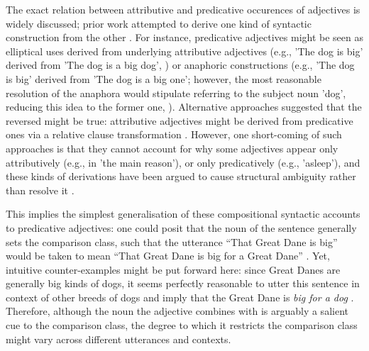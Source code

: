 The exact relation between attributive and predicative occurences of adjectives is widely discussed; prior work attempted to derive one kind of syntactic construction from the other \parencite[e.g.,][]{Cresswell1976}. For instance, predicative adjectives might be seen as elliptical uses derived from underlying attributive adjectives (e.g., 'The dog is big' derived from 'The dog is a big dog', \textcite[cf.][]{Kamp1975}) or anaphoric constructions (e.g., 'The dog is big' derived from 'The dog is a big one'; however, the most reasonable resolution of the anaphora would stipulate referring to the subject noun 'dog', reducing this idea to the former one, \textcite[cf.][]{goldberg2017one}). 
Alternative approaches suggested that the reversed might be true: attributive adjectives might be derived from predicative ones via a relative clause transformation \parencite["I bought the table. The table was big. $\rightarrow$ I bought the table that was big. $\rightarrow$ I bought the table big. $\rightarrow$ I bought the big table."; cf.][p. 2]{bolinger1967adjectives}. However, one short-coming of such approaches is that they cannot account for why some adjectives appear only attributively (e.g., in 'the main reason'), or only predicatively (e.g., 'asleep'), and these kinds of derivations have been argued to cause structural ambiguity rather than resolve it \parencite{bolinger1967adjectives}.

This implies the simplest generalisation of these compositional syntactic accounts to predicative adjectives: one could posit that the noun of the sentence generally sets the comparison class, such that the utterance “That Great Dane is big” would be taken to mean “That Great Dane is big for a Great Dane” \parencite{tessler2020}. Yet, intuitive counter-examples might be put forward here: since Great Danes are generally big kinds of dogs, it seems perfectly reasonable to utter this sentence in context of other breeds of dogs and imply that the Great Dane is \emph{big for a dog} \parencite{tessler2017warm}. 
Therefore, although the noun the adjective combines with is arguably a salient cue to the comparison class, the degree to which it restricts the comparison class might vary across different utterances and contexts.   

